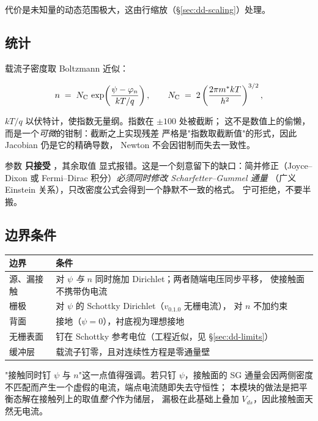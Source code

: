 代价是未知量的动态范围极大，这由行缩放（\S\ref{sec:dd-scaling}）处理。

\subsection{统计}
\label{sec:dd-statistics}

载流子密度取 Boltzmann 近似：

\begin{equation}
n \;=\; N_{\mathrm{C}}\,\exp\!\left(\frac{\psi-\varphi_n}{kT/q}\right),
\qquad
N_{\mathrm{C}} \;=\; 2\left(\frac{2\pi m^{*} kT}{h^{2}}\right)^{3/2},
\label{eq:dd-boltzmann}
\end{equation}

$kT/q$ 以伏特计，使指数无量纲。指数在 $\pm100$ 处被截断；
这不是数值上的偷懒，而是一个\emph{可微}的钳制：截断之上实现残差
严格是"指数取截断值"的形式，因此 Jacobian 仍是它的精确导数，
Newton 不会因钳制而失去一致性。

参数  \textbf{只接受} ，其余取值
显式报错。这是一个刻意留下的缺口：简并修正（Joyce--Dixon 或
Fermi--Dirac 积分）\emph{必须同时修改 Scharfetter--Gummel 通量}
（广义 Einstein 关系），只改密度公式会得到一个静默不一致的格式。
宁可拒绝，不要半搬。

\subsection{边界条件}
\label{sec:dd-boundary}

\begin{center}
\small
\begin{tabular}{@{}p{} p{}@{}}
\toprule
\textbf{边界} & \textbf{条件}\\
\midrule
源、漏接触 & 对 $\psi$ \emph{与} $n$ 同时施加 Dirichlet；两者随端电压同步平移，
  使接触面不携带伪电流\\
栅极 & 对 $\psi$ 的 Schottky Dirichlet（$v_{0.1.0}$ 无栅电流），
  对 $n$ 不加约束\\
背面 & 接地（$\psi=0$），衬底视为理想接地\\
无栅表面 & 钉在 Schottky 参考电位（工程近似，见 \S\ref{sec:dd-limits}）\\
缓冲层 & 载流子钉零，且对连续性方程是零通量壁\\
\bottomrule
\end{tabular}
\end{center}

"接触同时钉 $\psi$ 与 $n$"这一点值得强调。若只钉 $\psi$，接触面的
SG 通量会因两侧密度不匹配而产生一个虚假的电流，端点电流随即失去守恒性；
本模块的做法是把平衡态解在接触列上的取值\emph{整个}作为储层，
漏极在此基础上叠加 $V_{ds}$，因此接触面天然无电流。

